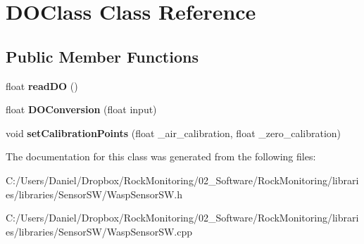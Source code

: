 \hypertarget{class_d_o_class}{}\section{D\+O\+Class Class Reference}
\label{class_d_o_class}
\subsection*{Public Member Functions}
\begin{DoxyCompactItemize}
\item 
float {\bfseries read\+DO} ()\hypertarget{class_d_o_class_adc384e62f6f0324aaf24348bd3af85bf}{}\label{class_d_o_class_adc384e62f6f0324aaf24348bd3af85bf}

\item 
float {\bfseries D\+O\+Conversion} (float input)\hypertarget{class_d_o_class_ab404d120fc47c0152a5e5ee09ae3c9d3}{}\label{class_d_o_class_ab404d120fc47c0152a5e5ee09ae3c9d3}

\item 
void {\bfseries set\+Calibration\+Points} (float \+\_\+air\+\_\+calibration, float \+\_\+zero\+\_\+calibration)\hypertarget{class_d_o_class_acd8815a4fae9a0a2cf2848671db8ab08}{}\label{class_d_o_class_acd8815a4fae9a0a2cf2848671db8ab08}

\end{DoxyCompactItemize}


The documentation for this class was generated from the following files\+:\begin{DoxyCompactItemize}
\item 
C\+:/\+Users/\+Daniel/\+Dropbox/\+Rock\+Monitoring/02\+\_\+\+Software/\+Rock\+Monitoring/libraries/libraries/\+Sensor\+S\+W/Wasp\+Sensor\+S\+W.\+h\item 
C\+:/\+Users/\+Daniel/\+Dropbox/\+Rock\+Monitoring/02\+\_\+\+Software/\+Rock\+Monitoring/libraries/libraries/\+Sensor\+S\+W/Wasp\+Sensor\+S\+W.\+cpp\end{DoxyCompactItemize}
